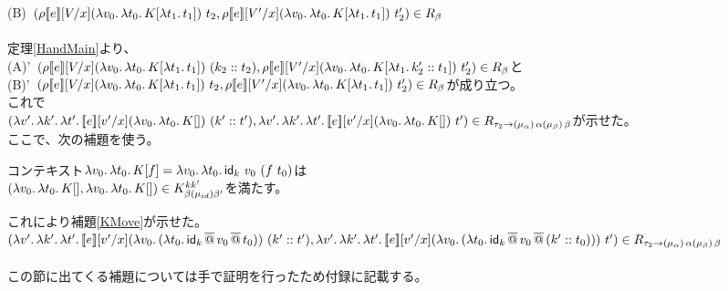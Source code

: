 (B)\ $(\rho \CPSTh{e}[\Change{x}{V}] \LamP{v_0}{\Lam{t_0}{K[\Lam{t_1}{t_1}]}}\ t_2,
 \rho \CPSTh{e}[\Change{x}{V'}] \LamP{v_0}{\Lam{t_0}{K[\Lam{t_1}{t_1}]}}\ t_2')\in R_{\beta}$\\
\\
定理\ref{HandMain}より、\\
(A)'\ $(\rho \CPSTh{e}[\Change{x}{V}] \LamP{v_0}{\Lam{t_0}{K[\Lam{t_1}{t_1}]}}\ \ConsP{k_2}{t_2}, \rho \CPSTh{e}[\Change{x}{V'}] \LamP{v_0}{\Lam{t_0}{K[\Lam{t_1}{\Cons{k_2'}{t_1}}]}}\ t_2')\in R_{\beta}$と\\
(B)'\  $(\rho \CPSTh{e}[\Change{x}{V}] \LamP{v_0}{\Lam{t_0}{K[\Lam{t_1}{t_1}]}}\ t_2, \rho \CPSTh{e}[\Change{x}{V'}] \LamP{v_0}{\Lam{t_0}{K[\Lam{t_1}{t_1}]}}\ t_2')\in R_{\beta}$が成り立つ。\\
これで\\
$(\Lam{v'}{\Lam{k'}{\Lam{t'}{\CPSTh{e}[\Change{x}{v'}] \LamP{v_0}{\Lam{t_0}{K[]}}\ \ConsP{k'}{t'}}}},\\
\Lam{v'}{\Lam{k'}{\Lam{t'}{\CPSTh{e}[\Change{x}{v'}] \LamP{v_0}{\Lam{t_0}{K[]}}\ t'}}})
\in R_{\tau_2 \rightarrow \TrailType{\alpha} \TrailType{\beta}}$が示せた。
\\
ここで、次の補題を使う。
\begin{lemma}
  コンテキスト$\Lam{v_0}{\Lam{t_0}{K[f]}}=\Lam{v_0}{\Lam{t_0}{\Idk\ v_0\ (f\ t_0)}}$は\\
  $(\Lam{v_0}{\Lam{t_0}{K[]}}, \Lam{v_0}{\Lam{t_0}{K[]}})\in  K^{kk'}_{\beta(\mu_{id})\beta'}$を満たす。
\label{IdkContext}
\end{lemma}
これにより補題\ref{KMove}が示せた。\\
$(\Lam{v'}{\Lam{k'}{\Lam{t'}{\CPSTh{e}[\Change{x}{v'}] \LamP{v_0}{\LamP{t_0}{\SApp{\Idk}{\SApp{v_0}{t_0}}}}\ \ConsP{k'}{t'}}}},\\
\Lam{v'}{\Lam{k'}{\Lam{t'}{\CPSTh{e}[\Change{x}{v'}] \LamP{v_0}{\LamP{t_0}{\SApp{\Idk}{\SApp{v_0}{\ConsP{k'}{t_0}}}}}\ t'}}})
\in R_{\tau_2 \rightarrow \TrailType{\alpha} \TrailType{\beta}}$\\
\\
この節に出てくる補題については手で証明を行ったため付録に記載する。

